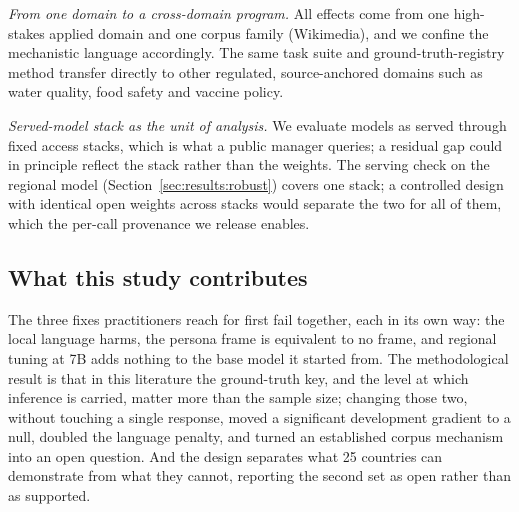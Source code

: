 \emph{From one domain to a cross-domain program.} All effects come from one
high-stakes applied domain and one corpus family (Wikimedia), and we confine
the mechanistic language accordingly. The same task suite and
ground-truth-registry method transfer directly to other regulated,
source-anchored domains such as water quality, food safety and vaccine policy.

\emph{Served-model stack as the unit of analysis.} We evaluate models as served
through fixed access stacks, which is what a public manager queries; a residual
gap could in principle reflect the stack rather than the weights. The serving
check on the regional model (Section~\ref{sec:results:robust}) covers one stack;
a controlled design with identical open weights across stacks would separate
the two for all of them, which the per-call provenance we release enables.

\subsection{What this study contributes}

The three fixes practitioners reach for first fail together, each in its own
way: the local language harms, the persona frame is equivalent to no frame, and
regional tuning at 7B adds nothing to the base model it started from. The
methodological result is that in this literature the ground-truth key, and the
level at which inference is carried, matter more than the sample size; changing
those two, without touching a single response, moved a significant development
gradient to a null, doubled the language penalty, and turned an established
corpus mechanism into an open question. And the design separates what 25
countries can demonstrate from what they cannot, reporting the second set as
open rather than as supported.
